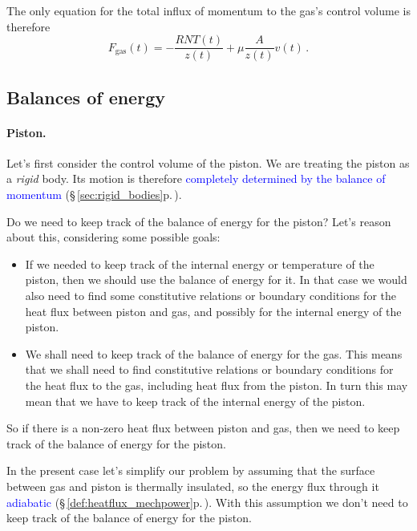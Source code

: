 \documentclass[a4paper,12pt,%
onecolumn,oneside,%
british%
]{memoir}
\renewcommand*{\|}[1][]{\nonscript\:#1\vert\nonscript\:\mathopen{}}
\newcommand*{\sect}{\S}%
\renewcommand*{\autoref}[3][\sect\,\ref]{\textcolor{blue}{#3} {\color{blue}\scriptsize(\faIcon[regular]{eye}\;#1{#2}\;p.\,\pageref{#2})}}
\newcommand*{\yvis}{\mu} %
\newcommand*{\yN}{N}
\newcommand*{\yFgas}{F_{\textrm{gas}}}
\newcommand*{\yT}{T}%
\begin{document}
\medskip

The only equation for the total influx of momentum to the gas's control volume is therefore
\begin{equation}
  \label{eq:gas_top_F}
      \yFgas(t) = -\frac{R \yN \yT(t)}{z(t)}  + \yvis \frac{A}{z(t)} v(t) \,.
\end{equation}

\subsection{Balances of energy}
\label{sec:idealgas_ex_energy}

\paragraph{Piston.} Let's first consider the control volume of the piston. We are treating the piston as a \emph{rigid} body. Its motion is therefore \autoref{sec:rigid_bodies}{completely determined by the balance of momentum}.

Do we need to keep track of the balance of energy for the piston? Let's reason about this, considering some possible goals:
\begin{itemize}[noitemsep]
\item If we needed to keep track of the internal energy or temperature of the piston, then we should use the balance of energy for it. In that case we would also need to find some constitutive relations or boundary conditions for the heat flux between piston and gas, and possibly for the internal energy of the piston.
\item We shall need to keep track of the balance of energy for the gas. This means that we shall need to find constitutive relations or boundary conditions for the heat flux to the gas, including heat flux from the piston. In turn this may mean that we have to keep track of the internal energy of the piston.
\end{itemize}
So if there is a non-zero heat flux between piston and gas, then we need to keep track of the balance of energy for the piston.

In the present case let's simplify our problem by assuming that the surface between gas and piston is thermally insulated, so the energy flux through it \autoref{def:heatflux_mechpower}{adiabatic}. With this assumption we don't need to keep track of the balance of energy for the piston.
\end{document}

